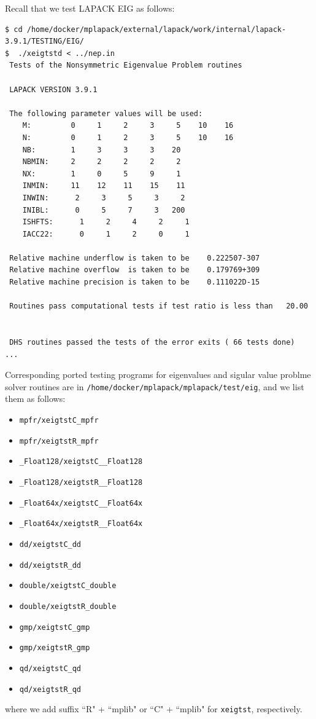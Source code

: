 \documentclass[12pt]{article}
\begin{document}
Recall that we test LAPACK EIG as follows:
\begin{verbatim}
$ cd /home/docker/mplapack/external/lapack/work/internal/lapack-3.9.1/TESTING/EIG/
$  ./xeigtstd < ../nep.in
 Tests of the Nonsymmetric Eigenvalue Problem routines

 LAPACK VERSION 3.9.1

 The following parameter values will be used:
    M:         0     1     2     3     5    10    16
    N:         0     1     2     3     5    10    16
    NB:        1     3     3     3    20
    NBMIN:     2     2     2     2     2
    NX:        1     0     5     9     1
    INMIN:     11    12    11    15    11
    INWIN:      2     3     5     3     2
    INIBL:      0     5     7     3   200
    ISHFTS:      1     2     4     2     1
    IACC22:      0     1     2     0     1

 Relative machine underflow is taken to be    0.222507-307
 Relative machine overflow  is taken to be    0.179769+309
 Relative machine precision is taken to be    0.111022D-15

 Routines pass computational tests if test ratio is less than   20.00


 DHS routines passed the tests of the error exits ( 66 tests done)
...
\end{verbatim}

Corresponding ported testing programs for eigenvalues and sigular value problme solver
routines are in {\tt /home/docker/mplapack/mplapack/test/eig}, and we list them as follows:
\begin{itemize}
\item {\tt mpfr/xeigtstC\_mpfr}
\item {\tt mpfr/xeigtstR\_mpfr}
\item {\tt \_Float128/xeigtstC\_\_Float128}
\item {\tt \_Float128/xeigtstR\_\_Float128}
\item {\tt \_Float64x/xeigtstC\_\_Float64x}
\item {\tt \_Float64x/xeigtstR\_\_Float64x}
\item {\tt dd/xeigtstC\_dd}
\item {\tt dd/xeigtstR\_dd}
\item {\tt double/xeigtstC\_double}
\item {\tt double/xeigtstR\_double}
\item {\tt gmp/xeigtstC\_gmp}
\item {\tt gmp/xeigtstR\_gmp}
\item {\tt qd/xeigtstC\_qd}
\item {\tt qd/xeigtstR\_qd}
\end{itemize}
where we add suffix ``R" + ``mplib" or ``C" + ``mplib" for {\tt xeigtst}, respectively.
\end{document}
